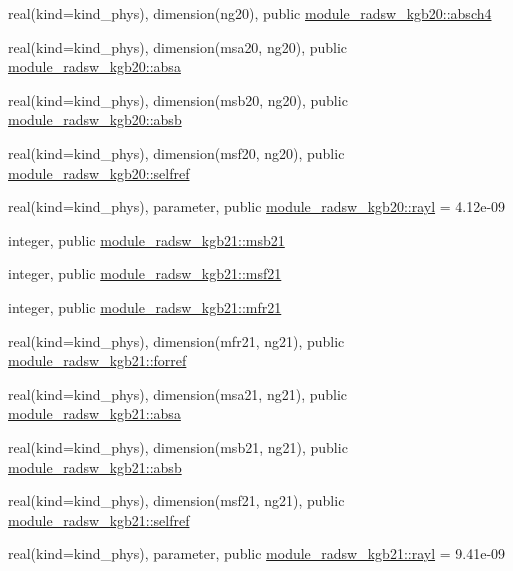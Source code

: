 \begin{DoxyCompactItemize}
real(kind=kind\+\_\+phys), dimension(ng20), public \hyperlink{group__module__radsw__main_ga1757aee0ec8211f84e2c9334cc9b0f9d}{module\+\_\+radsw\+\_\+kgb20\+::absch4}
\item 
real(kind=kind\+\_\+phys), dimension(msa20, ng20), public \hyperlink{group__module__radsw__main_ga405eabf194b1216dd083c2344e80f5b4}{module\+\_\+radsw\+\_\+kgb20\+::absa}
\item 
real(kind=kind\+\_\+phys), dimension(msb20, ng20), public \hyperlink{group__module__radsw__main_gaf5b135f82f34831e86a12f726cbe47ad}{module\+\_\+radsw\+\_\+kgb20\+::absb}
\item 
real(kind=kind\+\_\+phys), dimension(msf20, ng20), public \hyperlink{group__module__radsw__main_gaa3853af5e29277f9ed2bdd397cab5029}{module\+\_\+radsw\+\_\+kgb20\+::selfref}
\item 
real(kind=kind\+\_\+phys), parameter, public \hyperlink{group__module__radsw__main_ga6a00db6ce81c299d44ef5eadc1fe3b5b}{module\+\_\+radsw\+\_\+kgb20\+::rayl} = 4.\+12e-\/09
\item 
integer, public \hyperlink{group__module__radsw__main_ga59710ca5b31c30385ea968c0f01e2e81}{module\+\_\+radsw\+\_\+kgb21\+::msb21}
\item 
integer, public \hyperlink{group__module__radsw__main_gae70b5abfa847419cbf189d2502c34ddd}{module\+\_\+radsw\+\_\+kgb21\+::msf21}
\item 
integer, public \hyperlink{group__module__radsw__main_ga5575239aa9d55abcca1ac1f82dc4c4ec}{module\+\_\+radsw\+\_\+kgb21\+::mfr21}
\item 
real(kind=kind\+\_\+phys), dimension(mfr21, ng21), public \hyperlink{group__module__radsw__main_gac93d473e0309275f03a89b161377a034}{module\+\_\+radsw\+\_\+kgb21\+::forref}
\item 
real(kind=kind\+\_\+phys), dimension(msa21, ng21), public \hyperlink{group__module__radsw__main_ga7cce83c282d3efec6a3fe319480c270a}{module\+\_\+radsw\+\_\+kgb21\+::absa}
\item 
real(kind=kind\+\_\+phys), dimension(msb21, ng21), public \hyperlink{group__module__radsw__main_ga1d3f12f050c90be49f109205c463b29b}{module\+\_\+radsw\+\_\+kgb21\+::absb}
\item 
real(kind=kind\+\_\+phys), dimension(msf21, ng21), public \hyperlink{group__module__radsw__main_ga76fc3e4566fcee982b99b10ea562ba93}{module\+\_\+radsw\+\_\+kgb21\+::selfref}
\item 
real(kind=kind\+\_\+phys), parameter, public \hyperlink{group__module__radsw__main_ga8df418599fb8aef5fc8f2935a913b361}{module\+\_\+radsw\+\_\+kgb21\+::rayl} = 9.\+41e-\/09

\end{DoxyCompactItemize}
